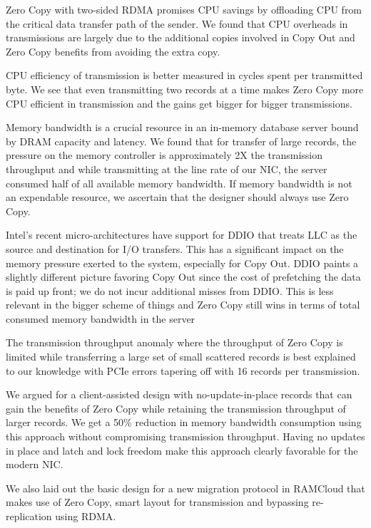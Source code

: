 Zero Copy with two-sided RDMA promises CPU savings by offloading CPU from the critical data transfer path of the sender. We found that CPU overheads in transmissions are largely due to the additional copies involved in Copy Out and Zero Copy benefits from avoiding the extra copy.

CPU efficiency of transmission is better measured in cycles spent per transmitted byte. We see that even transmitting two records at a time makes Zero Copy more CPU efficient in transmission and the gains get bigger for bigger transmissions.

Memory bandwidth is a crucial resource in an in-memory database server bound by DRAM capacity and latency. We found that for transfer of large records, the pressure on the memory controller is approximately 2X the transmission throughput and while transmitting at the line rate of our NIC, the server consumed half of all available memory bandwidth. If memory bandwidth is not an expendable resource, we ascertain that the designer should 
always use Zero Copy.

Intel\textregistered's recent micro-architectures have support for DDIO that treats LLC as the source and destination for I/O transfers. This has a significant impact on 
the memory pressure exerted to the system, especially for Copy Out. DDIO paints a slightly different picture favoring Copy Out since the cost of prefetching the data is 
paid up front; we do not incur additional misses from DDIO. This is less relevant in the bigger scheme of things and Zero Copy still wins in terms of total 
consumed memory bandwidth in the server

The transmission throughput anomaly where the throughput of Zero Copy is limited while transferring a large set of small scattered records is best explained to 
our knowledge with PCIe errors tapering off with 16 records per transmission.

We argued for a client-assisted design with no-update-in-place records that can gain the benefits of Zero Copy while retaining the transmission throughput of larger records. 
We get a 50\% reduction in memory bandwidth consumption using this approach without compromising transmission throughput. 
Having no updates in place and latch and lock freedom make this approach clearly favorable for the modern NIC. 

We also laid out the basic design for a new migration protocol in RAMCloud that makes use of Zero Copy, smart layout for transmission and bypassing re-replication using 
RDMA.

